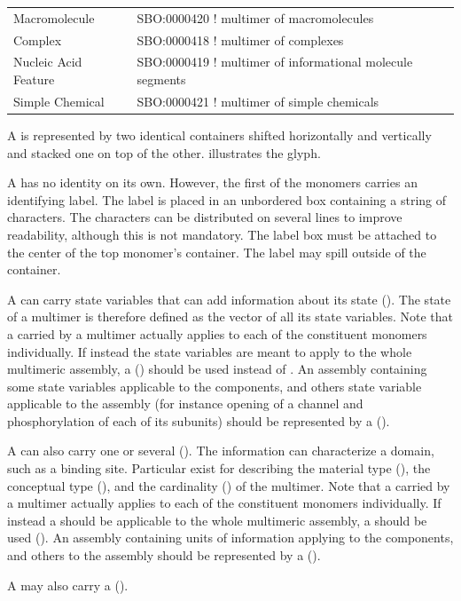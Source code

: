 \begin{glyphDescription}

\glyphSboTerm %
\begin{tabular}{l l}
Macromolecule & SBO:0000420 ! multimer of macromolecules \\
Complex & SBO:0000418 ! multimer of complexes \\
Nucleic Acid Feature & SBO:0000419 ! multimer of informational molecule segments \\
Simple Chemical & SBO:0000421 ! multimer of simple chemicals
\end{tabular}

\glyphContainer A  is represented by two identical containers shifted horizontally and vertically and stacked one on top of the other.   illustrates the glyph.

\glyphLabel A  has no identity on its own.  However, the first of the monomers carries an identifying label.  The label is placed in an unbordered box containing a string of characters.  The characters can be distributed on several lines to improve readability, although this is not mandatory.  The label box must be attached to the center of the top monomer's container.  The label may spill outside of the container.

\glyphAux A  can carry state variables that can add information about its state ().  The state of a multimer is therefore defined as the vector of all its state variables.  Note that a  carried by a multimer actually applies to each of the constituent monomers individually.  If instead the state variables are meant to apply to the whole multimeric assembly, a  () should be used instead of .  An assembly containing some state variables applicable to the components, and others state variable applicable to the assembly (for instance opening of a channel and phosphorylation of each of its subunits) should be represented by a  ().

A  can also carry one or several  ().  The information can characterize a domain, such as a binding site.  Particular  exist for describing the material type (), the conceptual type (), and the cardinality () of the multimer.  Note that a  carried by a multimer actually applies to each of the constituent monomers individually.  If instead a  should be applicable to the whole multimeric assembly, a  should be used (). An assembly containing units of information applying to the components, and others to the assembly should be represented by a  ().

A  may also carry a  ().

\end{glyphDescription}


